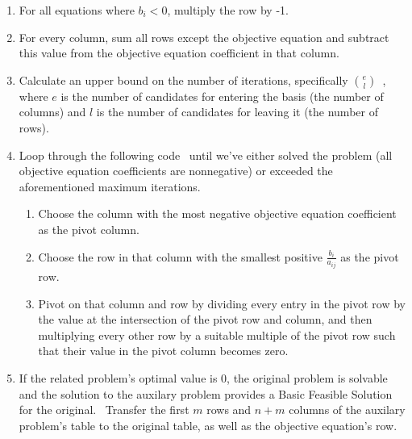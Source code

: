 \documentclass[11pt]{article}
\begin{document}
\begin{enumerate}
\item For all equations where $b_i < 0$, multiply the row by -1.~\cite{wolfram}
\item For every column, sum all rows except the objective equation and subtract this value from the objective equation coefficient in that column.~\cite{wolfram}
\item Calculate an upper bound on the number of iterations, specifically $e \choose l$~\cite{chvatal83}, where $e$ is the number of candidates for entering the basis (the number of columns) and $l$ is the number of candidates for leaving it (the number of rows). 
\item Loop through the following code~\cite{wolfram} until we've either solved the problem (all objective equation coefficients are nonnegative) or exceeded the aforementioned maximum iterations.
  \begin{enumerate}
  \item Choose the column with the most negative objective equation coefficient as the pivot column.
  \item Choose the row in that column with the smallest positive $\frac{b_i}{a_{ij}}$ as the pivot row.
  \item Pivot on that column and row by dividing every entry in the pivot row by the value at the intersection of the pivot row and column, and then multiplying every other row by a suitable multiple of the pivot row such that their value in the pivot column becomes zero.
  \end{enumerate}
\item If the related problem's optimal value is 0, the original problem is solvable and the solution to the auxilary problem provides a Basic Feasible Solution for the original.~\cite{chvatal83} Transfer the first $m$ rows and $n+m$ columns of the auxilary problem's table to the original table, as well as the objective equation's row.
\end{enumerate}
\end{document}

